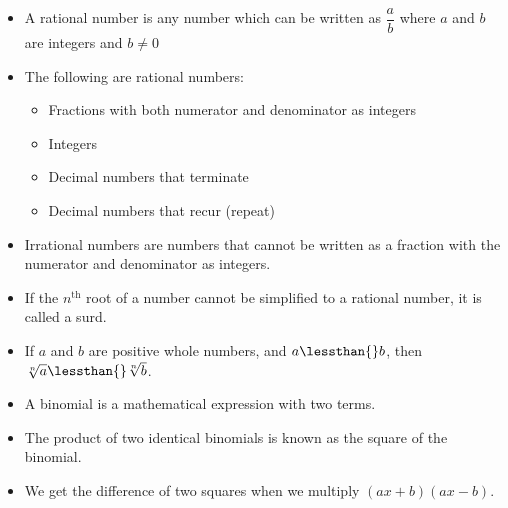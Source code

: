 \begin{itemize}[itemsep=5pt, label=\textbullet{}]

\item  A rational number is any number which can be written as $\dfrac{a}{b}$
where $a$ and $b$ are integers and $b\ne 0$\item The following are rational numbers:
    \begin{itemize}[noitemsep]
	\item Fractions with both numerator and denominator as integers
	\item Integers
	\item Decimal numbers that terminate
	\item Decimal numbers that recur (repeat)
    \end{itemize}
\item Irrational numbers are numbers that cannot be written as a fraction with the numerator and denominator as integers.
\item If the ${n}^{\mathrm{th}}$ root of a number cannot be simplified to a rational number, it is called a surd.
\item If $a$ and $b$ are positive whole numbers, and $a\lessthan{}b$, then $\sqrt[n]{a}\lessthan{}\sqrt[n]{b}$.
\item A binomial is a mathematical expression with two terms. 
\item The product of two identical binomials is known as the square of the binomial. 
\item We get the difference of two squares when we multiply $\left(ax+b\right)\left(ax-b\right)$.

\end{itemize}
